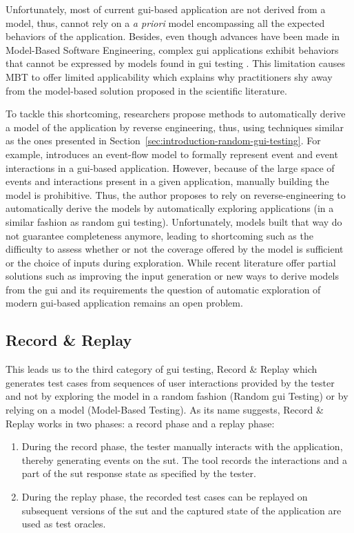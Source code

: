 Unfortunately, most of current \gls{gui}-based application are not derived from a model, thus, cannot rely on a \emph{a priori} model encompassing all the expected behaviors of the application. Besides, even though advances have been made in Model-Based Software Engineering, complex \gls{gui} applications exhibit behaviors that cannot be expressed by models found in \gls{gui} testing \cite{Lelli2015}. This limitation causes MBT to offer limited applicability which explains why practitioners shy away from the model-based solution proposed in the scientific literature.

To tackle this shortcoming, researchers propose methods to automatically derive a model of the application by reverse engineering, thus, using techniques similar as the ones presented in Section~\ref{sec:introduction-random-gui-testing}. For example, \textcite{Memon2007} introduces an event-flow model to formally represent event and event interactions in a \gls{gui}-based application. However, because of the large space of events and interactions present in a given application, manually building the model is prohibitive. Thus, the author proposes to rely on reverse-engineering to automatically derive the models by automatically exploring applications (in a similar fashion as random \gls{gui} testing). Unfortunately, models built that way do not guarantee completeness anymore, leading to shortcoming such as the difficulty to assess whether or not the coverage offered by the model is sufficient or the choice of inputs during exploration. While recent literature offer partial solutions such as improving the input generation \cite{Biagiola2019} or new ways to derive models from the \gls{gui} and its requirements \cite{Canny2020} the question of automatic exploration of modern \gls{gui}-based application remains an open problem.

\subsection{Record \& Replay}
\label{sec:introduction-record-and-replay}

This leads us to the third category of \gls{gui} testing, Record \& Replay which generates test cases from sequences of user interactions provided by the tester and not by exploring the model in a random fashion (Random \gls{gui} Testing) or by relying on a model (Model-Based Testing). As its name suggests, Record \& Replay works in two phases: a record phase and a replay phase:

\begin{enumerate}
    \item During the record phase, the tester manually interacts with the application, thereby generating events on the \gls{sut}. The tool records the interactions and a part of the \gls{sut} response state as specified by the tester.
    \item During the replay phase, the recorded test cases can be replayed on subsequent versions of the \gls{sut} and the captured state of the application are used as test oracles.
\end{enumerate}

